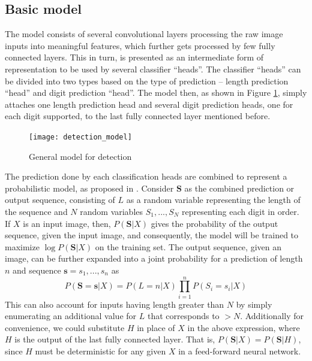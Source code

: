 \documentclass{article}
\begin{document}
	\subsection{Basic model}\label{basic_model}
	The model consists of several convolutional layers processing the raw image inputs into meaningful features, which further gets processed by few fully connected layers. This in turn, is presented as an intermediate form of representation to be used by several classifier ``heads''. The classifier ``heads'' can be divided into two types based on the type of prediction -- length prediction ``head'' and digit prediction ``head''. The model then, as shown in Figure \ref{fig:detection_model}, simply attaches one length prediction head and several digit prediction heads, one for each digit supported, to the last fully connected layer mentioned before. 
	
	\begin{figure}[h]
		\centering
		\texttt{[image: detection\_model]}
		\caption{General model for detection}
		\label{fig:detection_model}
	\end{figure}
	
	The prediction done by each classification heads are combined to represent a probabilistic model, as proposed in \cite{GoodfellowBIAS13}. Consider $\mathbf{S}$ as the combined prediction or output sequence, consisting of $L$ as a random variable representing the length of the sequence and $N$ random variables $S_1, ..., S_N$ representing each digit in order. If $X$ is an input image, then, $P(\mathbf{S}|X)$ gives the probability of the output sequence, given the input image, and consequently, the model will be trained to maximize $\log P(\mathbf{S}|X)$ on the training set. The output sequence, given an image, can be further expanded into a joint probability for a prediction of length $n$ and sequence $\mathbf{s} = s_1, ..., s_n$ as
	\[P(\mathbf{S}=\mathbf{s}|X) = P(L=n|X)\prod_{i=1}^{n}P(S_i=s_i|X)\]
	This can also account for inputs having length greater than $N$ by simply enumerating an additional value for $L$ that corresponds to $>N$. Additionally for convenience, we could substitute $H$ in place of $X$ in the above expression, where $H$ is the output of the last fully connected layer. That is, $P(\mathbf{S}|X) = P(\mathbf{S}|H)$, since $H$ must be deterministic for any given $X$ in a feed-forward neural network.
	
\end{document}
